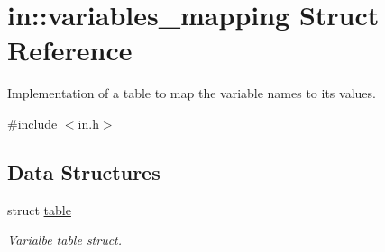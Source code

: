 \hypertarget{structin_1_1variables__mapping}{\section{in\-:\-:variables\-\_\-mapping Struct Reference}
\label{structin_1_1variables__mapping}
}


Implementation of a table to map the variable names to its values.  




{\ttfamily \#include $<$in.\-h$>$}

\subsection*{Data Structures}
\begin{DoxyCompactItemize}
\item 
struct \hyperlink{structin_1_1variables__mapping_1_1table}{table}
\begin{DoxyCompactList}\small\item\em Varialbe table struct. \end{DoxyCompactList}\end{DoxyCompactItemize}
